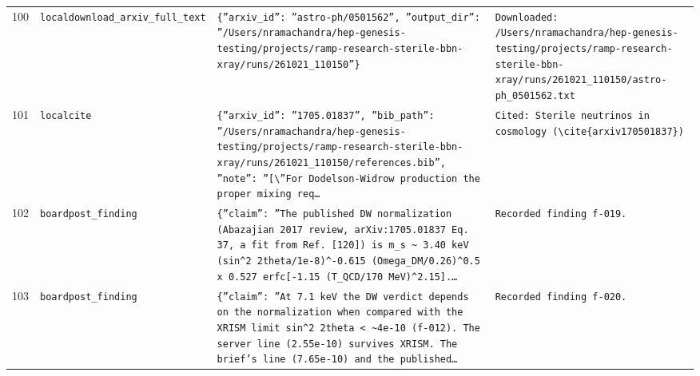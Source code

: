 \documentclass[11pt,a4paper]{article}
\begin{document}
\begin{longtable}{@{}p{}p{}p{}p{}@{}}
100 & \texttt{local}\newline\texttt{download\_\allowbreak{}arxiv\_\allowbreak{}full\_\allowbreak{}text} & \texttt{\{''arxiv\_\allowbreak{}id'':\allowbreak{} ''astro-ph/\allowbreak{}0501562'',\allowbreak{} ''output\_\allowbreak{}dir'':\allowbreak{} ''/\allowbreak{}Users/\allowbreak{}nramachandra/\allowbreak{}hep-genesis-testing/\allowbreak{}projects/\allowbreak{}ramp-research-sterile-bbn-xray/\allowbreak{}runs/\allowbreak{}261021\_\allowbreak{}110150''\}\allowbreak{}} & \texttt{Downloaded:\allowbreak{} /\allowbreak{}Users/\allowbreak{}nramachandra/\allowbreak{}hep-genesis-testing/\allowbreak{}projects/\allowbreak{}ramp-research-sterile-bbn-xray/\allowbreak{}runs/\allowbreak{}261021\_\allowbreak{}110150/\allowbreak{}astro-ph\_\allowbreak{}0501562.txt} \\
101 & \texttt{local}\newline\texttt{cite} & \texttt{\{''arxiv\_\allowbreak{}id'':\allowbreak{} ''1705.01837'',\allowbreak{} ''bib\_\allowbreak{}path'':\allowbreak{} ''/\allowbreak{}Users/\allowbreak{}nramachandra/\allowbreak{}hep-genesis-testing/\allowbreak{}projects/\allowbreak{}ramp-research-sterile-bbn-xray/\allowbreak{}runs/\allowbreak{}261021\_\allowbreak{}110150/\allowbreak{}references.bib'',\allowbreak{} ''note'':\allowbreak{} ''[\textbackslash{}\allowbreak{}''For Dodelson-Widrow production the proper mixing req\ldots{}\allowbreak{}} & \texttt{Cited:\allowbreak{} Sterile neutrinos in cosmology (\textbackslash{}\allowbreak{}cite\{arxiv170501837\}\allowbreak{})\allowbreak{}} \\
102 & \texttt{board}\newline\texttt{post\_\allowbreak{}finding} & \texttt{\{''claim'':\allowbreak{} ''The published DW normalization (Abazajian 2017 review,\allowbreak{} arXiv:\allowbreak{}1705.01837 Eq. 37,\allowbreak{} a fit from Ref. [120]\allowbreak{})\allowbreak{} is m\_\allowbreak{}s \textasciitilde{}\allowbreak{} 3.40 keV (sin\textasciicircum{}\allowbreak{}2 2theta/\allowbreak{}1e-8)\allowbreak{}\textasciicircum{}\allowbreak{}-0.615 (Omega\_\allowbreak{}DM/\allowbreak{}0.26)\allowbreak{}\textasciicircum{}\allowbreak{}0.5 x 0.527 erfc[-1.15 (T\_\allowbreak{}QCD/\allowbreak{}170 MeV)\allowbreak{}\textasciicircum{}\allowbreak{}2.15]\allowbreak{}.\ldots{}\allowbreak{}} & \texttt{Recorded finding f-019.} \\
103 & \texttt{board}\newline\texttt{post\_\allowbreak{}finding} & \texttt{\{''claim'':\allowbreak{} ''At 7.1 keV the DW verdict depends on the normalization when compared with the XRISM limit sin\textasciicircum{}\allowbreak{}2 2theta \textless{}\allowbreak{} \textasciitilde{}\allowbreak{}4e-10 (f-012)\allowbreak{}. The server line (2.55e-10)\allowbreak{} survives XRISM. The brief's line (7.65e-10)\allowbreak{} and the published\ldots{}\allowbreak{}} & \texttt{Recorded finding f-020.} \\

\end{longtable}
\end{document}
